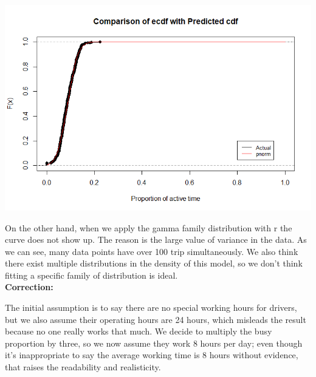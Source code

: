 \documentclass[11pt]{article}
\begin{document}
\noindent\includegraphics[scale = .70]{Busy_time_cdf.png}\\
\par
On the other hand, when we apply the gamma family distribution with r  the curve does not show up. The reason is the large value of variance
in the data. As we can see, many data points have over 100%
trip simultaneously. We also think there exist multiple distributions in the density of this model, so we don’t think fitting a specific family
of distribution is ideal. \\

\noindent\textbf{Correction:}\\
\par
The initial assumption is to say there are no special working hours for drivers, but we also assume their operating hours are 24 hours,
which misleads the result because no one really works that much. We decide to multiply the busy proportion by three, so we now assume they
work 8 hours per day; even though it’s inappropriate to say the average working time is 8 hours without evidence, that raises the readability
and realisticity.
\end{document}
